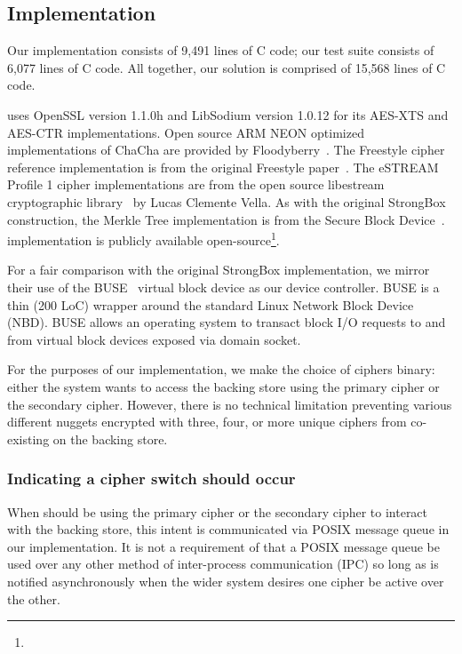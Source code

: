 \subsection{Implementation}

Our \SYSTEM{} implementation consists of 9,491 lines of C code; our test suite
consists of 6,077 lines of C code. All together, our solution is comprised of
15,568 lines of C code.

\SYSTEM{} uses OpenSSL version 1.1.0h and LibSodium version 1.0.12 for its
AES-XTS and AES-CTR implementations. Open source ARM NEON optimized
implementations of ChaCha are provided by Floodyberry~\cite{Floodyberry}. The
Freestyle cipher reference implementation is from the original Freestyle
paper~\cite{Freestyle}. The eSTREAM Profile 1 cipher implementations are from
the open source libestream cryptographic library~\cite{libestream} by Lucas
Clemente Vella. As with the original StrongBox construction, the Merkle Tree
implementation is from the Secure Block Device~\cite{SBD}. \SYSTEM{}
implementation is publicly available open-source\footnote{\SystemURI}.

For a fair comparison with the original StrongBox implementation, we mirror
their use of the BUSE~\cite{BUSE} virtual block device as our device controller.
BUSE is a thin (200 LoC) wrapper around the standard Linux Network Block Device
(NBD). BUSE allows an operating system to transact block I/O requests to and
from virtual block devices exposed via domain socket.

For the purposes of our implementation, we make the choice of ciphers binary:
either the system wants \SYSTEM{} to access the backing store using the primary
cipher or the secondary cipher. However, there is no technical limitation
preventing various different nuggets encrypted with three, four, or more unique
ciphers from co-existing on the backing store.

\subsubsection{Indicating a cipher switch should occur}

When \SYSTEM{} should be using the primary cipher or the secondary cipher to
interact with the backing store, this intent is communicated via POSIX message
queue in our implementation. It is not a requirement of \SYSTEM{} that a POSIX
message queue be used over any other method of inter-process communication (IPC)
so long as \SYSTEM{} is notified asynchronously when the wider system desires
one cipher be active over the other.

